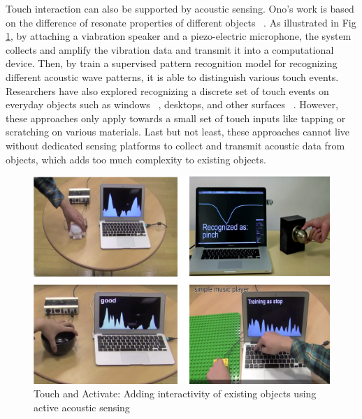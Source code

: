 Touch interaction can also be supported by acoustic sensing.  Ono's work is based on the difference of resonate properties of different objects ~\cite{Ono-Touch-and-Activate}. As illustrated in Fig \ref{fig:acoustic-sensing}, by attaching a viabration speaker and a piezo-electric microphone, the system collects and amplify the vibration data and transmit it into a computational device. Then, by train a supervised pattern recognition model for recognizing different acoustic wave patterns, it is able to distinguish various touch events. Researchers have also explored recognizing a discrete set of touch events on everyday objects such as windows ~\cite{Paradiso-2002-Window}, desktops, and other surfaces ~\cite{Harrison-2008-Scratch-iput}. However, these approaches only apply towards a small set of touch inputs like tapping or scratching on various materials. Last but not least, these approaches cannot live without dedicated sensing platforms to collect and transmit acoustic data from objects, which adds too much complexity to existing objects.

\begin{figure}[ht]
    \centering
	\includegraphics[width=0.88\columnwidth]{figures/acoustic-sensing.png}
	\setlength{\belowcaptionskip}{-6pt}
    \caption{Touch and Activate: Adding interactivity of existing objects using active acoustic sensing}
    \label{fig:acoustic-sensing}
\end{figure}


